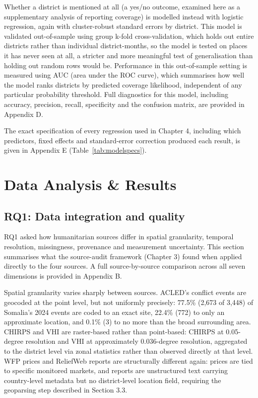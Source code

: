 \documentclass[12pt,a4paper]{article}
\begin{document}
Whether a district is mentioned at all (a yes/no outcome, examined here as a supplementary analysis of reporting coverage) is modelled instead with logistic regression, again with cluster-robust standard errors by district. This model is validated out-of-sample using group k-fold cross-validation, which holds out entire districts rather than individual district-months, so the model is tested on places it has never seen at all, a stricter and more meaningful test of generalisation than holding out random rows would be. Performance in this out-of-sample setting is measured using AUC (area under the ROC curve), which summarises how well the model ranks districts by predicted coverage likelihood, independent of any particular probability threshold. Full diagnostics for this model, including accuracy, precision, recall, specificity and the confusion matrix, are provided in Appendix D.

The exact specification of every regression used in Chapter 4, including which predictors, fixed effects and standard-error correction produced each result, is given in Appendix E (Table~\ref{tab:modelspecs}).

\clearpage
\section{Data Analysis \& Results}

\subsection{RQ1: Data integration and quality}

RQ1 asked how humanitarian sources differ in spatial granularity, temporal resolution, missingness, provenance and measurement uncertainty. This section summarises what the source-audit framework (Chapter 3) found when applied directly to the four sources. A full source-by-source comparison across all seven dimensions is provided in Appendix B.

Spatial granularity varies sharply between sources. ACLED's conflict events are geocoded at the point level, but not uniformly precisely: 77.5\% (2,673 of 3,448) of Somalia's 2024 events are coded to an exact site, 22.4\% (772) to only an approximate location, and 0.1\% (3) to no more than the broad surrounding area. CHIRPS and VHI are raster-based rather than point-based: CHIRPS at 0.05-degree resolution and VHI at approximately 0.036-degree resolution, aggregated to the district level via zonal statistics rather than observed directly at that level. WFP prices and ReliefWeb reports are structurally different again: prices are tied to specific monitored markets, and reports are unstructured text carrying country-level metadata but no district-level location field, requiring the geoparsing step described in Section 3.3.
\end{document}
